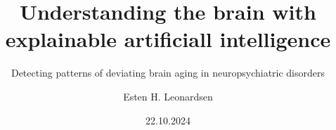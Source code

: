 \documentclass{beamer}
\title{Understanding the brain with explainable artificiall intelligence}
\subtitle{Detecting patterns of deviating brain aging in neuropsychiatric disorders}
\date{22.10.2024}
\author{Esten H. Leonardsen}
\begin{document}
    \begin{frame}
        \titlepage
    \end{frame}







\end{document}
